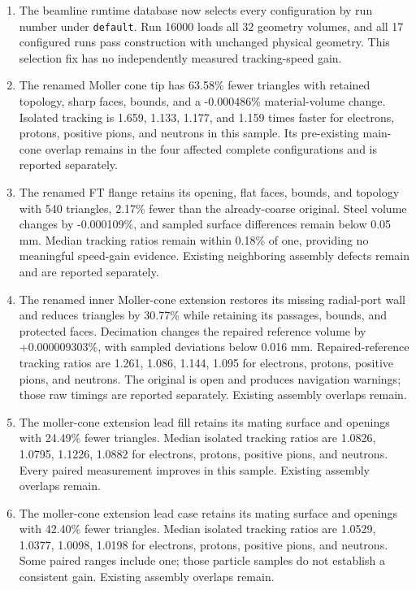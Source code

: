 \begin{enumerate}
\item The beamline runtime database now selects every configuration by run number under \texttt{default}.
Run 16000 loads all 32 geometry volumes, and all 17 configured runs pass construction with unchanged
physical geometry. This selection fix has no independently measured tracking-speed gain.

\item The renamed Moller cone tip has 63.58\% fewer triangles with retained topology, sharp faces, bounds, and
a -0.000486\% material-volume change. Isolated tracking is 1.659, 1.133, 1.177, and 1.159 times faster for
electrons, protons, positive pions, and neutrons in this sample. Its pre-existing main-cone overlap remains in
the four affected complete configurations and is reported separately.

\item The renamed FT flange retains its opening, flat faces, bounds, and topology with 540 triangles, 2.17\%
fewer than the already-coarse original. Steel volume changes by -0.000109\%, and sampled surface differences
remain below 0.05 mm. Median tracking ratios remain within 0.18\% of one, providing no meaningful speed-gain
evidence. Existing neighboring assembly defects remain and are reported separately.

\item The renamed inner Moller-cone extension restores its missing radial-port wall and reduces triangles by
30.77\% while retaining its passages, bounds, and protected faces. Decimation changes the repaired reference
volume by +0.000009303\%, with sampled deviations below 0.016 mm. Repaired-reference tracking ratios are
1.261, 1.086, 1.144, 1.095 for electrons, protons, positive pions, and neutrons. The original is open and
produces navigation warnings; those raw timings are reported separately. Existing assembly overlaps remain.

\item The moller-cone extension lead fill retains its mating surface and openings with 24.49\% fewer
triangles. Median isolated tracking ratios are 1.0826, 1.0795, 1.1226, 1.0882 for electrons, protons, positive
pions, and neutrons. Every paired measurement improves in this sample. Existing assembly overlaps remain.

\item The moller-cone extension lead case retains its mating surface and openings with 42.40\% fewer
triangles. Median isolated tracking ratios are 1.0529, 1.0377, 1.0098, 1.0198 for electrons, protons, positive
pions, and neutrons. Some paired ranges include one; those particle samples do not establish a consistent
gain. Existing assembly overlaps remain.


\end{enumerate}
